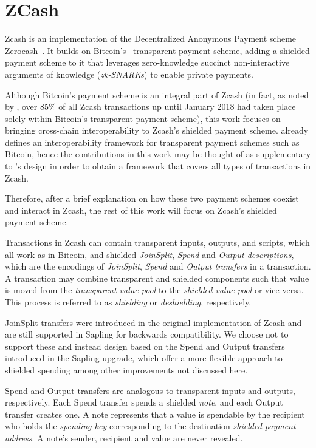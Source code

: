 \section{ZCash}
\label{sec:zcash}

Zcash is an implementation of the Decentralized Anonymous Payment scheme Zerocash~\cite{sasson2014zerocash}.
It builds on Bitcoin's~\cite{nakamoto2008bitcoin} transparent payment scheme, adding a shielded payment scheme to it that leverages zero-knowledge succinct non-interactive arguments of knowledge (\emph{zk-SNARKs}) to enable private payments.

Although Bitcoin's payment scheme is an integral part of Zcash (in fact, as noted by \textcite{kappos2018anonymity}, over 85\% of all Zcash transactions up until January 2018 had taken place solely within Bitcoin's transparent payment scheme), this work focuses on bringing cross-chain interoperability to Zcash's shielded payment scheme.
\xclaim already defines an interoperability framework for transparent payment schemes such as Bitcoin, hence the contributions in this work may be thought of as supplementary to \xclaim's design in order to obtain a framework that covers all types of transactions in Zcash.

Therefore, after a brief explanation on how these two payment schemes coexist and interact in Zcash, the rest of this work will focus on Zcash's shielded payment scheme.

Transactions in Zcash can contain transparent inputs, outputs, and scripts, which all work as in Bitcoin, and shielded \emph{JoinSplit}, \emph{Spend} and \emph{Output descriptions}, which are the encodings of \emph{JoinSplit}, \emph{Spend} and \emph{Output transfers} in a transaction.
A transaction may combine transparent and shielded components such that value is moved from the \emph{transparent value pool} to the \emph{shielded value pool} or vice-versa.
This process is referred to as \emph{shielding} or \emph{deshielding}, respectively.

JoinSplit transfers were introduced in the original implementation of Zcash and are still supported in Sapling for backwards compatibility.
We choose not to support these and instead design \zclaim based on the Spend and Output transfers introduced in the Sapling upgrade, which offer a more flexible approach to shielded spending among other improvements not discussed here.

Spend and Output transfers are analogous to transparent inputs and outputs, respectively.
Each Spend transfer spends a shielded \emph{note}, and each Output transfer creates one.
A note represents that a value \val is spendable by the recipient who holds the \emph{spending key} corresponding to the destination \emph{shielded payment address}.
A note's sender, recipient and value are never revealed.


